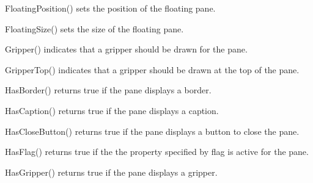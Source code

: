 FloatingPosition() sets the position of the floating pane.

\label{wxauipaneinfofloatingsize}


FloatingSize() sets the size of the floating pane.

\label{wxauipaneinfogripper}


Gripper() indicates that a gripper should be drawn for the pane.

\label{wxauipaneinfogrippertop}


GripperTop() indicates that a gripper should be drawn at the top of the pane.

\label{wxauipaneinfohasborder}


HasBorder() returns true if the pane displays a border.

\label{wxauipaneinfohascaption}


HasCaption() returns true if the pane displays a caption.

\label{wxauipaneinfohasclosebutton}


HasCloseButton() returns true if the pane displays a button to close the pane.

\label{wxauipaneinfohasflag}


HasFlag() returns true if the the property specified by flag is active for the pane.

\label{wxauipaneinfohasgripper}


HasGripper() returns true if the pane displays a gripper.

